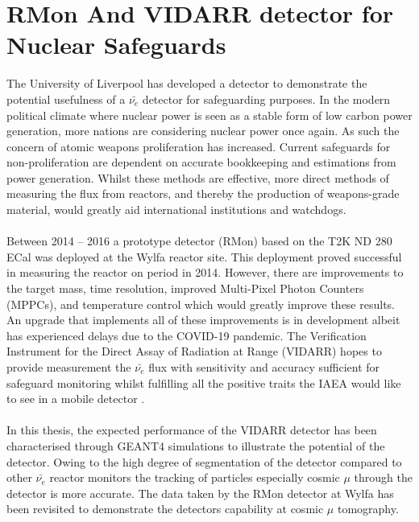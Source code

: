 \section{RMon And VIDARR detector for Nuclear Safeguards}
The University of Liverpool has developed a detector to demonstrate the potential usefulness of a $\bar{\nu_e}$ detector for safeguarding purposes. In the modern political climate where nuclear power is seen as a stable form of low carbon power generation, more nations are considering nuclear power once again. As such the concern of atomic weapons proliferation has increased. Current safeguards for non-proliferation are dependent on accurate bookkeeping and estimations from power generation. Whilst these methods are effective, more direct methods of measuring the flux from reactors, and thereby the production of weapons-grade material, would greatly aid international institutions and watchdogs.
\\\\Between 2014 -- 2016 a prototype detector (RMon) based on the T2K ND 280 ECal \cite{Allan_2013} was deployed at the Wylfa reactor site. This deployment proved successful in measuring the reactor on period in 2014. However, there are improvements to the target mass, time resolution, improved Multi-Pixel Photon Counters (MPPCs), and temperature control which would greatly improve these results. An upgrade that implements all of these improvements is in development albeit has experienced delays due to the COVID-19 pandemic. The Verification Instrument for the Direct Assay of Radiation at Range (VIDARR) hopes to provide measurement the $\bar{\nu_e}$ flux with sensitivity and accuracy sufficient for safeguard monitoring whilst fulfilling all the positive traits the IAEA would like to see in a mobile detector \cite{IAEA_2008}.
\\\\In this thesis, the expected performance of the VIDARR detector has been characterised through GEANT4 \cite{Agostinelli:2002hh} simulations to illustrate the potential of the detector. Owing to the high degree of segmentation of the detector compared to other $\bar{\nu_e}$ reactor monitors the tracking of particles especially cosmic $\mu$ through the detector is more accurate. The data taken by the RMon detector at Wylfa has been revisited to demonstrate the detectors capability at cosmic $\mu$ tomography.

